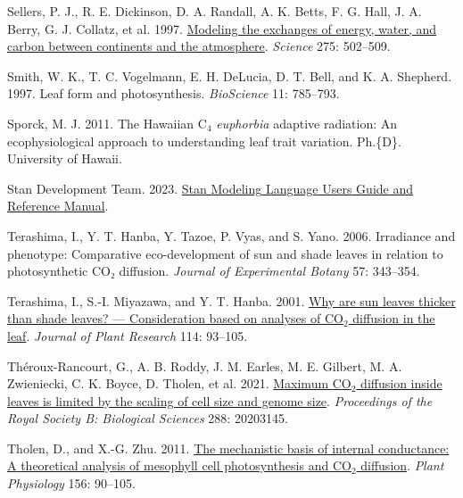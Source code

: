 \documentclass[
  letterpaper,
  DIV=11,
  numbers=noendperiod]{scrartcl}
\newlength{\cslhangindent}
\newlength{\cslentryspacingunit} %
\newenvironment{CSLReferences}[2] %
 {%
  \setlength{\parindent}{0pt}
  \ifodd #1
  \let\oldpar\par
  \def\par{\hangindent=\cslhangindent\oldpar}
  \fi
  \setlength{\parskip}{#2\cslentryspacingunit}
 }%
 {}
\begin{document}
\begin{CSLReferences}{1}{0}
\leavevmode{}%
Sellers, P. J., R. E. Dickinson, D. A. Randall, A. K. Betts, F. G. Hall,
J. A. Berry, G. J. Collatz, et al. 1997.
\href{https://doi.org/10.1126/science.275.5299.502}{Modeling the
exchanges of energy, water, and carbon between continents and the
atmosphere}. \emph{Science} 275: 502--509.

\leavevmode{}%
Smith, W. K., T. C. Vogelmann, E. H. DeLucia, D. T. Bell, and K. A.
Shepherd. 1997. Leaf form and photosynthesis. \emph{BioScience} 11:
785--793.

\leavevmode{}%
Sporck, M. J. 2011. The {Hawaiian} {C}\(_{\textrm{4}}\) \emph{euphorbia}
adaptive radiation: An ecophysiological approach to understanding leaf
trait variation. Ph.\{D\}. University of Hawaii.

\leavevmode{}%
Stan Development Team. 2023. \href{https://mc-stan.org}{Stan {Modeling}
{Language} {Users} {Guide} and {Reference} {Manual}}.

\leavevmode{}%
Terashima, I., Y. T. Hanba, Y. Tazoe, P. Vyas, and S. Yano. 2006.
Irradiance and phenotype: Comparative eco-development of sun and shade
leaves in relation to photosynthetic {CO}₂ diffusion. \emph{Journal of
Experimental Botany} 57: 343--354.

\leavevmode{}%
Terashima, I., S.-I. Miyazawa, and Y. T. Hanba. 2001.
\href{https://doi.org/10.1007/PL00013972}{Why are sun leaves thicker
than shade leaves? --- {Consideration} based on analyses of
{CO}\(_{\textrm{2}}\) diffusion in the leaf}. \emph{Journal of Plant
Research} 114: 93--105.

\leavevmode{}%
Théroux-Rancourt, G., A. B. Roddy, J. M. Earles, M. E. Gilbert, M. A.
Zwieniecki, C. K. Boyce, D. Tholen, et al. 2021.
\href{https://doi.org/10.1098/rspb.2020.3145}{Maximum
{CO}\(_{\textrm{2}}\) diffusion inside leaves is limited by the scaling
of cell size and genome size}. \emph{Proceedings of the Royal Society B:
Biological Sciences} 288: 20203145.

\leavevmode{}%
Tholen, D., and X.-G. Zhu. 2011.
\href{https://doi.org/10.1104/pp.111.172346}{The mechanistic basis of
internal conductance: {A} theoretical analysis of mesophyll cell
photosynthesis and {CO}\(_{\textrm{2}}\) diffusion}. \emph{Plant
Physiology} 156: 90--105.


\end{CSLReferences}
\end{document}
